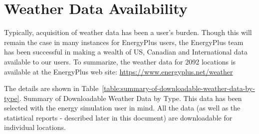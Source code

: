 \section{Weather Data Availability}\label{weather-data-availability}

Typically, acquisition of weather data has been a user's burden. Though this will remain the case in many instances for EnergyPlus users, the EnergyPlus team has been successful in making a wealth of US, Canadian and International data available to our users. To summarize, the weather data for 2092 locations is available at the EnergyPlus web site: \href{https://www.energyplus.net/weather}{https://www.energyplus.net/weather}

The details are shown in Table~\ref{table:summary-of-downloadable-weather-data-by-type}. Summary of Downloadable Weather Data by Type. This data has been selected with the energy simulation user in mind. All the data (as well as the statistical reports - described later in this document) are downloadable for individual locations.

